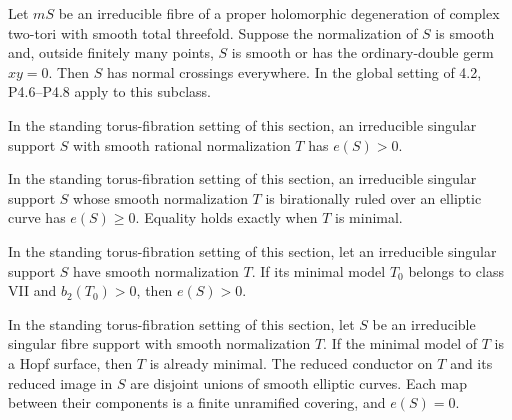 \begin{proposition}[P4.20]\hypertarget{tag-02WS}{}\label{night:P4.20}\label{stmt:P4.20}


Let $mS$ be an irreducible fibre of a proper holomorphic
degeneration of complex two-tori with smooth total threefold.
Suppose the normalization of $S$ is smooth and, outside
finitely many points, $S$ is smooth or has the ordinary-double
germ $xy=0$. Then $S$ has normal crossings everywhere.
In the global setting of 4.2, P4.6--P4.8 apply to this subclass.
\end{proposition}

\begin{proposition}[P4.21]\hypertarget{tag-02WT}{}\label{night:P4.21}\label{stmt:P4.21}


In the standing torus-fibration setting of this section, an irreducible singular support $S$
with smooth rational normalization $T$ has $e(S)>0$.
\end{proposition}

\begin{proposition}[P4.22]\hypertarget{tag-02WU}{}\label{night:P4.22}\label{stmt:P4.22}


In the standing torus-fibration setting of this section, an irreducible singular support
$S$ whose smooth normalization $T$ is birationally ruled
over an elliptic curve has $e(S)\ge0$. Equality holds
exactly when $T$ is minimal.
\end{proposition}

\begin{proposition}[P4.23]\hypertarget{tag-02WV}{}\label{night:P4.23}\label{stmt:P4.23}


In the standing torus-fibration setting of this section, let an irreducible singular support
$S$ have smooth normalization $T$. If its minimal model $T_0$
belongs to class VII and $b_2(T_0)>0$, then $e(S)>0$.
\end{proposition}

\begin{proposition}[P4.24]\hypertarget{tag-02WW}{}\label{night:P4.24}\label{stmt:P4.24}


In the standing torus-fibration setting of this section, let $S$ be an irreducible
singular fibre support with smooth normalization $T$.
If the minimal model of $T$ is a Hopf surface, then
$T$ is already minimal. The reduced conductor on $T$
and its reduced image in $S$ are disjoint unions of
smooth elliptic curves. Each map between their
components is a finite unramified covering, and
$e(S)=0$.
\end{proposition}

